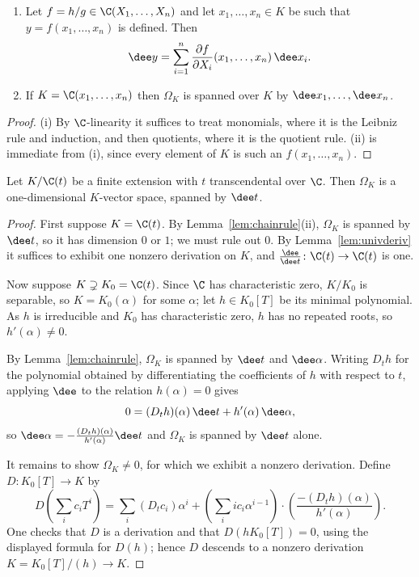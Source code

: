 \begin{lemma}\label{lem:chainrule}
	\begin{enumerate}[label=(\roman*)]
		\item Let $f = h/g \in \C(X_1,\dots,X_n)$ and let $x_1,\dots,x_n \in K$ be such that $y = f(x_1,\dots,x_n)$ is defined. Then
		$$\dee y = \sum_{i=1}^n \frac{\partial f}{\partial X_i}(x_1,\dots,x_n)\,\dee x_i.$$
		\item If $K = \C(x_1,\dots,x_n)$ then $\Omega_K$ is spanned over $K$ by $\dee x_1,\dots,\dee x_n$.
	\end{enumerate}
\end{lemma}

\begin{proof}
	(i) By $\C$-linearity it suffices to treat monomials, where it is the Leibniz rule and induction, and then quotients, where it is the quotient rule. (ii) is immediate from (i), since every element of $K$ is such an $f(x_1,\dots,x_n)$.
\end{proof}

\begin{theorem}\label{thm:omega1dim}
	Let $K/\C(t)$ be a finite extension with $t$ transcendental over $\C$. Then $\Omega_K$ is a one-dimensional $K$-vector space, spanned by $\dee t$.
\end{theorem}

\begin{proof}
	First suppose $K = \C(t)$. By Lemma~\ref{lem:chainrule}(ii), $\Omega_K$ is spanned by $\dee t$, so it has dimension $0$ or $1$; we must rule out $0$. By Lemma~\ref{lem:univderiv} it suffices to exhibit one nonzero derivation on $K$, and $\frac{\dee}{\dee t} \colon \C(t)\to\C(t)$ is one.

	Now suppose $K \supsetneq K_0 = \C(t)$. Since $\C$ has characteristic zero, $K/K_0$ is separable, so $K = K_0(\alpha)$ for some $\alpha$; let $h \in K_0[T]$ be its minimal polynomial. As $h$ is irreducible and $K_0$ has characteristic zero, $h$ has no repeated roots, so $h'(\alpha)\neq 0$.

	By Lemma~\ref{lem:chainrule}, $\Omega_K$ is spanned by $\dee t$ and $\dee\alpha$. Writing $D_th$ for the polynomial obtained by differentiating the coefficients of $h$ with respect to $t$, applying $\dee$ to the relation $h(\alpha) = 0$ gives
	$$0 = (D_th)(\alpha)\,\dee t + h'(\alpha)\,\dee\alpha,$$
	so $\dee\alpha = -\frac{(D_th)(\alpha)}{h'(\alpha)}\dee t$ and $\Omega_K$ is spanned by $\dee t$ alone.

	It remains to show $\Omega_K \neq 0$, for which we exhibit a nonzero derivation. Define $D \colon K_0[T]\to K$ by
	$$D\!\left(\sum_i c_iT^i\right) = \sum_i (D_tc_i)\alpha^i + \left(\sum_i ic_i\alpha^{i-1}\right)\cdot\left(\frac{-(D_th)(\alpha)}{h'(\alpha)}\right).$$
	One checks that $D$ is a derivation and that $D(h K_0[T]) = 0$, using the displayed formula for $D(h)$; hence $D$ descends to a nonzero derivation $K = K_0[T]/(h)\to K$.
\end{proof}

